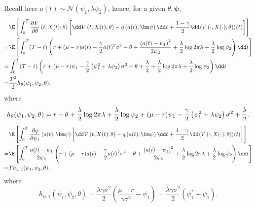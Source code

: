 Recall here $a(t)\sim \mathcal{N}(\psi_1,\lambda\psi_2)$, hence, for a given $\theta,\bm\psi$,
\[ \begin{aligned}
& \E\left[  \int_0^T \frac{\partial V}{\partial \theta}\left(t, X(t);\theta \right) \left[ \dd V\left(t , X(t);\theta  \right) - q\left( a(t) ;\bm\psi\right)\dd t + \frac{1-\gamma}{2}\dd \langle V\left( \cdot,X(\cdot);\theta \right)\rangle(t)  \right]  \right] \\
= & \E\left[ \int_0^T (T-t)   \left( r + (\mu - r)a(t) - \frac{\gamma}{2}a(t)^2\sigma^2  -\theta +  \frac{\left( a(t) - \psi_{1} \right)^2}{2\psi_{2}} + \frac{\lambda}{2}\log2\pi\lambda + \frac{\lambda}{2}\log\psi_{2} \right)\dd t \right] \\
= & \int_0^T (T-t) \left(  r + (\mu - r) \psi_{1} - \frac{\gamma}{2}\left( \psi_{1}^2 + \lambda \psi_{2} \right) \sigma^2  -\theta +  \frac{\lambda}{2} + \frac{\lambda}{2}\log2\pi\lambda + \frac{\lambda}{2}\log\psi_{2} \right) \dd t \\
= & \frac{T^2}{2} h_{\theta}( \psi_{1},\psi_{2},\theta),
\end{aligned} \]
where 
\begin{equation}
\label{eq:mean update theta}
h_{\theta}( \psi_{1},\psi_{2},\theta) \\
=  r-\theta+\frac{\lambda}{2}\log2\pi\lambda+\frac{\lambda}{2}\log\psi_2 +  (\mu - r) \psi_{1}  - \frac{\gamma}{2}\left( \psi_{1}^2 + \lambda \psi_{2} \right) \sigma^2  +  \frac{\lambda}{2} .   
\end{equation}
\[ \begin{aligned}
& \E\left[  \int_0^T \frac{\partial q}{\partial \psi_1}\left( a(t);\bm\psi \right) \left[ \dd V\left(t , X(t);\theta  \right) - q\left( a(t) ;\bm\psi\right)\dd t + \frac{1-\gamma}{2}\dd \langle V\left( \cdot,X(\cdot);\theta \right)\rangle(t)  \right]   \right] \\
= & \E\left[ \int_0^T \frac{a(t) - \psi_1}{2\psi_2}  \left( r + (\mu - r)a(t) - \frac{\gamma}{2}a(t)^2\sigma^2  -\theta +  \frac{\left( a(t) - \psi_{1} \right)^2}{2\psi_{2}} + \frac{\lambda}{2}\log2\pi\lambda + \frac{\lambda}{2}\log\psi_{2} \right)\dd t \right] \\
= & T h_{\psi,1}( \psi_{1},\psi_{2},\theta),
\end{aligned} \]
where 
\begin{equation}
\label{eq:mean update psi 1}
h_{\psi, 1}( \psi_{1},\psi_{2},\theta) = \frac{\lambda \gamma \sigma^2}{2} \left( \frac{\mu-r}{\gamma\sigma^2} - \psi_1 \right) = \frac{\lambda \gamma \sigma^2}{2} \left( \psi_1^* - \psi_1 \right).
\end{equation}
